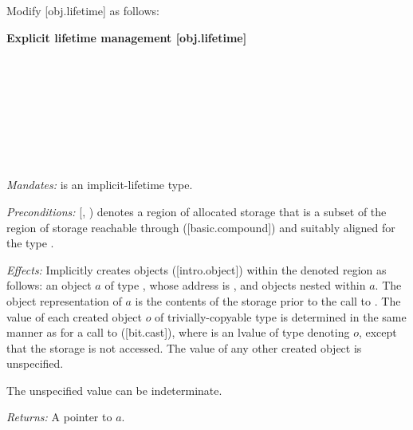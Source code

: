 Modify [obj.lifetime] as follows:

\textbf{Explicit lifetime management \hspace{83mm}[obj.lifetime]}

\begin{adjustwidth}{0.5cm}{0.5cm}
\small{} \\
\small{} \\
\small{} \\
\small{} \\
\small{} \\
\small{} \\
\small{} \\
\small{}

\emph{Mandates:}  is an implicit-lifetime type.

\emph{Preconditions:} [, ) denotes a region of allocated storage that is a subset of the region of storage reachable through ([basic.compound])  and suitably aligned for the type .

\emph{Effects:} Implicitly creates objects ([intro.object]) within the denoted region as follows: an object $a$ of type , whose address is , and objects nested within $a$. The object representation of $a$ is the contents of the storage prior to the call to . The value of each created object $o$ of trivially-copyable type  is determined in the same manner as for a call to  ([bit.cast]), where  is an lvalue of type  denoting $o$, except that the storage is not accessed. The value of any other created object is unspecified. \begin{note}The unspecified value can be indeterminate.\end{note}

\emph{Returns:} A pointer to $a$.


\end{adjustwidth}
